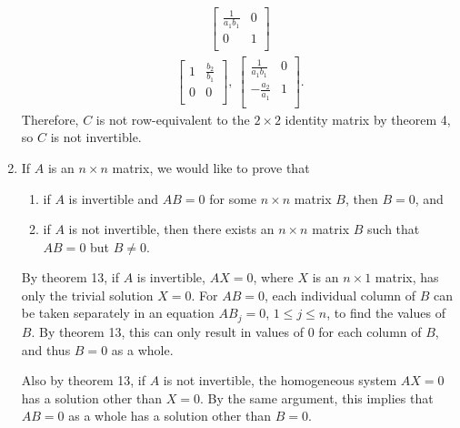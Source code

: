 \documentclass[12pt]{article}
\begin{document}
\begin{enumerate}
\begin{align*}
\begin{bmatrix}
        \frac{1}{a_1b_1} & 0\\
        0 & 1\\
      \end{bmatrix}
    \end{align*}
    \begin{align*}
      \begin{bmatrix}
        1 & \frac{b_2}{b_1}\\
        0 & 0\\
      \end{bmatrix},\
      \begin{bmatrix}
        \frac{1}{a_1b_1} & 0\\
        -\frac{a_2}{a_1} & 1\\
      \end{bmatrix}.
    \end{align*}
    Therefore, $C$ is not row-equivalent to the $2 \times 2$
    identity matrix by theorem 4, so $C$ is not invertible.

  \item
    If $A$ is an $n \times n$ matrix, we would like to prove that
    \begin{enumerate}
      \item if $A$ is invertible and $AB = 0$ for some $n \times
        n$ matrix $B$, then $B = 0$, and
      \item if $A$ is not invertible, then there exists an $n
        \times n$ matrix $B$ such that $AB = 0$ but $B \neq 0$.
    \end{enumerate}

    By theorem 13, if $A$ is invertible, $AX = 0$, where $X$ is
    an $n \times 1$ matrix, has only the trivial solution $X =
    0$. For $AB = 0$, each individual column of $B$ can be taken
    separately in an equation $AB_j = 0$, $1 \leq j \leq n$, to
    find the values of $B$. By theorem 13, this can only result
    in values of $0$ for each column of $B$, and thus $B = 0$ as
    a whole.

    Also by theorem 13, if $A$ is not invertible, the homogeneous
    system $AX = 0$ has a solution other than $X = 0$. By the
    same argument, this implies that $AB = 0$ as a whole has a
    solution other than $B = 0$.


\end{enumerate}
\end{document}
